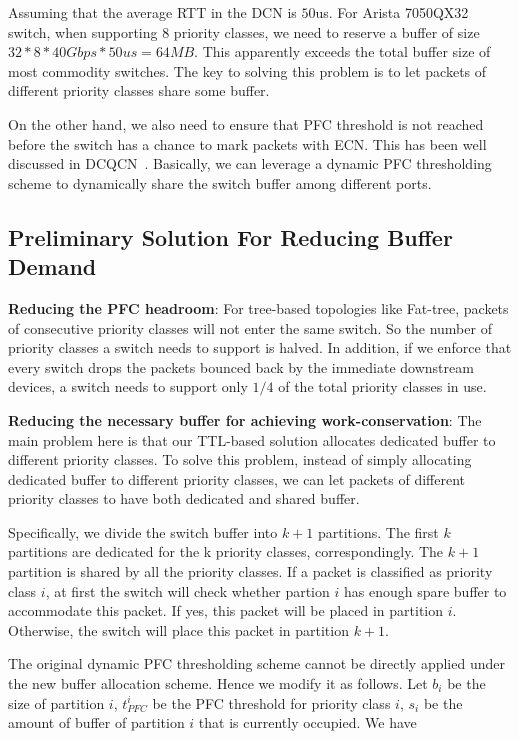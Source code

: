 Assuming that the average RTT in the DCN is $50$us. For Arista 7050QX32 switch, when supporting 8 priority classes, we need to reserve a buffer of size $32*8*40Gbps*50us=64MB$. This apparently exceeds the total buffer size of most commodity switches. The key to solving this problem is to let packets of different priority classes share some buffer.

On the other hand, we also need to ensure that PFC threshold is not reached before the switch has a chance to mark packets with ECN. This has been well discussed in DCQCN~\cite{dcqcn}. Basically, we can leverage a dynamic PFC thresholding scheme to dynamically share the switch buffer among different ports.

\subsection{Preliminary Solution For Reducing Buffer Demand}\label{subsec:solforreducebuffer}

\textbf{Reducing the PFC headroom}: For tree-based topologies like Fat-tree, packets of consecutive priority classes will not enter the same switch. So the number of priority classes a switch needs to support is halved. In addition, if we enforce that every switch drops the packets bounced back by the immediate downstream devices, a switch needs to support only $1/4$ of the total priority classes in use.

\textbf{Reducing the necessary buffer for achieving work-conservation}: The main problem here is that our TTL-based solution allocates dedicated buffer to different priority classes. To solve this problem, instead of simply allocating dedicated buffer to different priority classes, we can let packets of different priority classes to have both dedicated and shared buffer.

Specifically, we divide the switch buffer into $k+1$ partitions. The first $k$ partitions are dedicated for the k priority classes, correspondingly. The $k+1$ partition is shared by all the priority classes. If a packet is classified as priority class $i$, at first the switch will check whether partion $i$ has enough spare buffer to accommodate this packet. If yes, this packet will be placed in partition $i$. Otherwise, the switch will place this packet in partition $k+1$.

The original dynamic PFC thresholding scheme cannot be directly applied under the new buffer allocation scheme. Hence we modify it as follows. Let $b_i$ be the size of partition $i$, $t^i_{PFC}$ be the PFC threshold for priority class $i$, $s_i$ be the amount of buffer of partition $i$ that is currently occupied. We have

